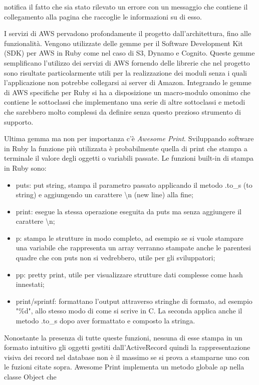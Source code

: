 \documentclass[target=bach,aauheader=,style=]{thud}
\begin{document}
notifica il fatto che sia stato rilevato un errore con un messaggio che contiene il collegamento alla pagina che raccoglie le informazioni su di esso.
\par I servizi di AWS pervadono profondamente il progetto dall'architettura, fino alle funzionalità. Vengono utilizzate delle gemme per il Software Development Kit (SDK)
per AWS\cite{aws_sdk_ruby} in Ruby come nel caso di S3, Dynamo e Cognito. Queste gemme semplificano l'utilizzo dei servizi di AWS fornendo delle librerie che
nel progetto sono risultate particolarmente utili per la realizzazione dei moduli senza i quali l'applicazione non potrebbe collegarsi ai server di Amazon.
Integrando le gemme di AWS specifiche per Ruby si ha a disposizione un macro-modulo omonimo che contiene le sottoclassi che implementano una serie di altre sottoclassi e
metodi che sarebbero molto complessi da definire senza questo prezioso strumento di supporto.
\par Ultima gemma ma non per importanza c'è \textit{Awesome Print}\cite{awesome_print_gem}. Sviluppando software in Ruby la funzione più utilizzata è probabilmente quella di print che
stampa a terminale il valore degli oggetti o variabili passate. Le funzioni built-in di stampa in Ruby sono:
\begin{itemize}
    \item puts: put string, stampa il parametro passato applicando il metodo .to\_s (to string) e aggiungendo un carattere \textbackslash n (new line) alla fine;
    \item print: esegue la stessa operazione eseguita da puts ma senza aggiungere il carattere \textbackslash n;
    \item p: stampa le strutture in modo completo, ad esempio se si vuole stampare una variabile che rappresenta un array verranno stampate anche le parentesi
          quadre che con puts non si vedrebbero, utile per gli sviluppatori;
    \item pp: pretty print, utile per visualizzare strutture dati complesse come hash innestati;
    \item print/sprintf: formattano l'output attraverso stringhe di formato, ad esempio "\%d", allo stesso modo di come si scrive in C.
          La seconda applica anche il metodo .to\_s dopo aver formattato e composto la stringa.
\end{itemize}
Nonostante la presenza di tutte queste funzioni, nessuna di esse stampa in un formato intuitivo gli oggetti gestiti dall'ActiveRecord quindi la rappresentazione
visiva dei record nel database non è il massimo se si prova a stamparne uno con le fuzioni citate sopra. Awesome Print implementa un metodo globale ap nella classe Object che
\end{document}
